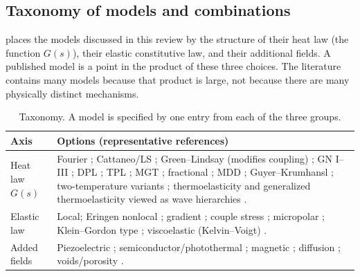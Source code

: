 \subsection{Taxonomy of models and combinations}
 places the models discussed in this review by the structure of their heat law (the function $G(s)$), their elastic constitutive law, and their additional fields. A published model is a point in the product of these three choices. The literature contains many models because that product is large, not because there are many physically distinct mechanisms.
\begin{table}[ht]\centering\small
\caption{Taxonomy. A model is specified by one entry from each of the three groups.}\label{tab:taxonomy}
\begin{tabularx}{\textwidth}{@{}p{2.6cm}X@{}}\toprule
Axis & Options (representative references)\\\midrule
Heat law $G(s)$ & Fourier \citep{Biot1956}; Cattaneo/LS \citep{Lord1967}; Green--Lindsay (modifies coupling) \citep{Green1972}; GN I--III \citep{Green1991,Green1993}; DPL \citep{Tzou1995}; TPL \citep{RoyChoudhuri2007}; MGT \citep{Quintanilla2019}; fractional \citep{Povstenko2016}; MDD \citep{Wang2011}; Guyer--Krumhansl \citep{GuyerKrumhansl1966II}; two-temperature variants \citep{Youssef2006}; thermoelasticity and generalized thermoelasticity viewed as wave hierarchies \citep{Scott2007}.\\
Elastic law & Local; Eringen nonlocal \citep{Eringen1972,Eringen1974}; gradient \citep{Aifantis1992,Askes2011}; couple stress \citep{MindlinTiersten1962}; micropolar \citep{Eringen1999}; Klein--Gordon type \citep{Lazar2022}; viscoelastic (Kelvin--Voigt) \citep{Gupta2026HeatMap}.\\
Added fields & Piezoelectric \citep{Mindlin1974Thermopiezo}; semiconductor/photothermal \citep{Gupta2023}; magnetic \citep{Ezzat2011}; diffusion \citep{Abouelregal2020a}; voids/porosity \citep{Cowin1983,Iesan1986,Singh2020}.\\\bottomrule
\end{tabularx}
\end{table}

